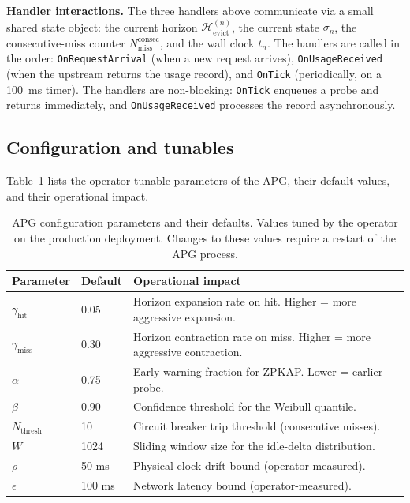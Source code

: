 \noindent
\textbf{Handler interactions.} The three handlers above
communicate via a small shared state object: the current
horizon $\mathcal{H}_{\text{evict}}^{(n)}$, the current state
$\sigma_n$, the consecutive-miss counter
$N_{\text{miss}}^{\text{consec}}$, and the wall clock $t_n$.
The handlers are called in the order: \texttt{OnRequestArrival}
(when a new request arrives), \texttt{OnUsageReceived} (when
the upstream returns the usage record), and \texttt{OnTick}
(periodically, on a 100~ms timer). The handlers are
non-blocking: \texttt{OnTick} enqueues a probe and returns
immediately, and \texttt{OnUsageReceived} processes the
record asynchronously.

\subsection{Configuration and tunables}
\label{app:apg:config}

Table~\ref{tab:apg-config} lists the operator-tunable parameters
of the APG, their default values, and their operational impact.

\begin{table}[ht]
\centering
\caption{APG configuration parameters and their defaults. Values
tuned by the operator on the production deployment. Changes to
these values require a restart of the APG process.}
\label{tab:apg-config}
\begin{tabular}{lll}
\toprule
\textbf{Parameter} & \textbf{Default} & \textbf{Operational impact} \\
\midrule
$\gamma_{\text{hit}}$         & 0.05 & Horizon expansion rate on hit. Higher = more aggressive expansion. \\
$\gamma_{\text{miss}}$        & 0.30 & Horizon contraction rate on miss. Higher = more aggressive contraction. \\
$\alpha$                      & 0.75 & Early-warning fraction for ZPKAP. Lower = earlier probe. \\
$\beta$                       & 0.90 & Confidence threshold for the Weibull quantile. \\
$N_{\text{thresh}}$           & 10   & Circuit breaker trip threshold (consecutive misses). \\
$W$                           & 1024 & Sliding window size for the idle-delta distribution. \\
$\rho$                        & 50 ms & Physical clock drift bound (operator-measured). \\
$\epsilon$                    & 100 ms & Network latency bound (operator-measured). \\
\bottomrule
\end{tabular}
\end{table}

